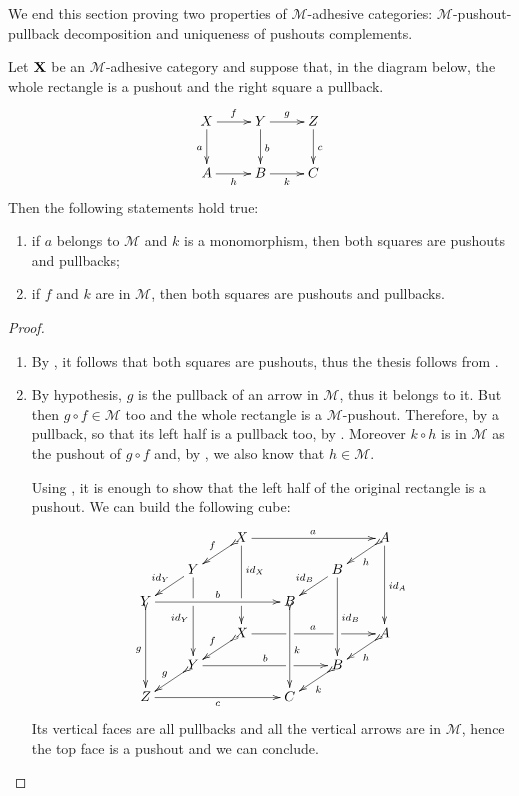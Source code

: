 \documentclass[a4paper,UKenglish,cleveref,pdftex, thm-restate,numberwithinsect]{lipics}
\newcommand{\id}[1]{\mathsf{id}_{#1}}
\def\X{\textbf {\textup{X}}}
\def\Y{\textbf {\textup{Y}}}
\begin{document}
\begin{example}
\end{example}

We end this section proving two properties of $\mathcal{M}$-adhesive categories:  $\mathcal{M}$-pushout-pullback decomposition and uniqueness of pushouts complements.


\begin{lemma}\label{lem:popb} Let $\X$ be an $\mathcal{M}$-adhesive category  and suppose that, in the diagram below, the whole rectangle is a pushout and the right square a pullback.
\[\xymatrix{X \ar[d]_{a} \ar[r]^{f}& \ar[r]^{g} Y \ar[d]^{b}& Z \ar[d]^{c}\\ A \ar[r]_{h}& B \ar[r]_{k}& C}\]
	Then the following statements hold true:
	\begin{enumerate}
\item if $a$ belongs to $\mathcal{M}$ and $k$ is a monomorphism,  then both squares are pushouts and pullbacks;
\item if $f$ and $k $ are in  $\mathcal{M}$, then both squares are pushouts and pullbacks.
	\end{enumerate}
\end{lemma}
\begin{proof}
\begin{enumerate}
	\item By , it follows that both squares are pushouts, thus the thesis follows from .
	\item By hypothesis, $g$ is the pullback of an arrow in $\mathcal{M}$, thus it belongs to it. But then $g\circ f\in \mathcal{M}$ too  and the whole rectangle is a $\mathcal{M}$-pushout. Therefore, by  a pullback, so that its left half is a pullback too, by . Moreover $k\circ h$ is in $\mathcal{M}$ as the pushout of $g\circ f$ and, by , we also know that $h\in \mathcal{M}$.  
	
	Using , it is enough to show that the left half of the original rectangle is a pushout. We can build the following cube:
	\[\xymatrix@C=20pt@R=10pt{ & &X\ar@{>->}[dl]_{f} \ar[ddd]^(.333333){\id{X}}|(.666666)\hole\ar[rrr]^{a} &&&A \ar[ddd]^{\id{A}} \ar@{>->}[dl]^{h}\\& Y\ar[dl]_{\id{Y}} \ar[ddd]|(.333333)\hole_{\id{Y}} &&&B \ar[ddd]^{\id{B}} \ar[dl]_{\id{B}} \\Y \ar@{>->}[ddd]_{g} \ar[rrr]^{b}&&& B\ar@{>->}[ddd]^{k}\\&&X \ar[rrr]|(.34)\hole^{a}|(.67)\hole \ar@{>->}[dl]_{f}&&& A \ar@{>->}[dl]^{h}\\ & Y \ar[rrr]|(.67)\hole^{b} \ar@{>->}[dl]_{g}&&& B \ar@{>->}[dl]^{k}\\ Z\ar[rrr]_{c} &&& C}\]
	Its vertical faces are all pullbacks and all the vertical arrows are in $\mathcal{M}$, hence the top face is a pushout and we can conclude. \qedhere 
\end{enumerate}
\end{proof}
\end{document}
